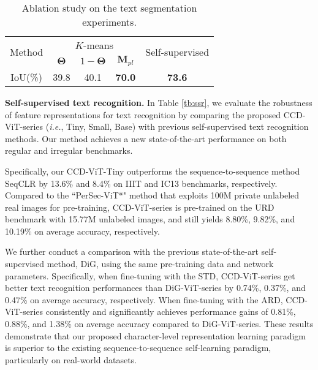 \documentclass[10pt,twocolumn,letterpaper]{article}
\begin{document}
\begin{table}[t]
  \centering
  \caption{Ablation study on the text segmentation experiments.}
\begin{tabular}{cccccccc}
  \toprule
  \multirow{2}{*}{Method} & \multicolumn{6}{c}{$K$-means} & \multirow{2}{*}{Self-supervised}\\ 
  \cline{2-7} & \multicolumn{2}{c}{$\bm{\Theta}$} & \multicolumn{2}{c}{$1-\bm{\Theta}$} & \multicolumn{2}{c}{$\mathbf{M}_{pl}$} \\
  \midrule
  IoU(\%) &\multicolumn{2}{c}{39.8} &\multicolumn{2}{c}{40.1} &\multicolumn{2}{c}{\textbf{70.0}} &\textbf{73.6}\\
  \bottomrule
  \end{tabular}
  \label{tb:pseudo label selection}
  \vspace{-1.0em}
\end{table}
\noindent \textbf{Self-supervised text recognition.}
In Table \ref{tb:ssr}, we evaluate the robustness of feature representations for text recognition by comparing the proposed CCD-ViT-series (\emph{i.e.}, Tiny, Small, Base) with previous self-supervised text recognition methods. Our method achieves a new state-of-the-art performance on both regular and irregular benchmarks. 

Specifically, our CCD-ViT-Tiny outperforms the sequence-to-sequence method SeqCLR by 13.6\% and 8.4\% on IIIT and IC13 benchmarks, respectively. Compared to the ``PerSec-ViT*" method that exploits 100M private unlabeled real images for pre-training, CCD-ViT-series is pre-trained on the URD benchmark with 15.77M unlabeled images, and still yields 8.80\%, 9.82\%, and 10.19\% on average accuracy, respectively.

We further conduct a comparison with the previous state-of-the-art self-supervised method, DiG, using the same pre-training data and network parameters. 
Specifically, when fine-tuning with the STD, CCD-ViT-series get better text recognition performances than DiG-ViT-series by 0.74\%, 0.37\%, and 0.47\% on average accuracy, respectively. When fine-tuning with the ARD, CCD-ViT-series consistently and significantly achieves performance gains of 0.81\%, 0.88\%, and 1.38\% on average accuracy compared to DiG-ViT-series. These results demonstrate that our proposed character-level representation learning paradigm is superior to the existing sequence-to-sequence self-learning paradigm, particularly on real-world datasets.
  
\end{document}
